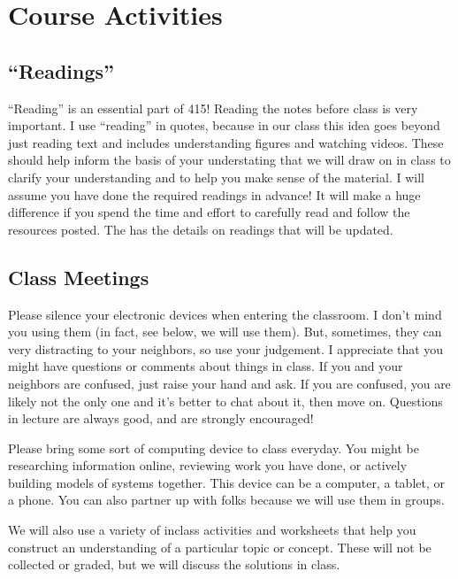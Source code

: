\documentclass[letterpaper,10pt,english]{jupyterBook}
\begin{document}
\section{Course Activities}
\label{\detokenize{content/0_course/design:course-activities}}

\subsection{“Readings”}
\label{\detokenize{content/0_course/design:readings}}
\sphinxAtStartPar
“Reading” is an essential part of 415! Reading the notes before class is very important. I use “reading” in quotes, because in our class this idea goes beyond just reading text and includes understanding figures and watching videos. These should help inform the basis of your understating that we will draw on in class to clarify your understanding and to help you make sense of the material. I will assume you have done the required readings in advance! It will make a huge difference if you spend the time and effort to carefully read and follow the resources posted. The
 has the details on readings that will be updated.


\subsection{Class Meetings}
\label{\detokenize{content/0_course/design:class-meetings}}
\sphinxAtStartPar
{} Please silence your electronic devices when entering the classroom. I don’t mind you using them (in fact, see below, we will use them). But, sometimes, they can very distracting to your neighbors, so use your judgement. I appreciate that you might have questions or comments about things in class. If you and your neighbors are confused, just raise your hand and ask. If you are confused, you are likely not the only one and it’s better to chat about it, then move on. Questions in lecture are always good, and are strongly encouraged!

\sphinxAtStartPar
{} Please bring some sort of computing device to class everyday. You might be researching information online, reviewing work you have done, or actively building models of systems together. This device can be a computer, a tablet, or a phone. You can also partner up with folks because we will use them in groups.

\sphinxAtStartPar
{} We will also use a variety of in\sphinxhyphen{}class activities and worksheets that help you construct an understanding of a particular topic or concept. These will not be collected or graded, but we will discuss the solutions in class.
\end{document}
